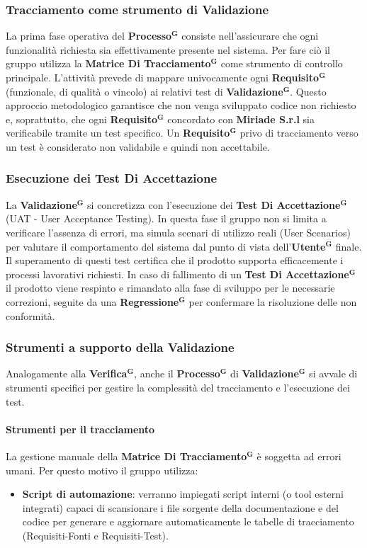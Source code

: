 \documentclass[a4paper,12pt]{article}
\newcommand{\term}[1]{\textbf{#1}$^\mathbf{G}$}
\begin{document}
\subsubsection{Tracciamento come strumento di Validazione}
La prima fase operativa del \term{Processo} consiste nell'assicurare che ogni funzionalità richiesta sia effettivamente presente nel sistema. Per fare ciò il gruppo utilizza la \textbf{\term{Matrice Di Tracciamento}} come strumento di controllo principale.
L'attività prevede di mappare univocamente ogni \term{Requisito} (funzionale, di qualità o vincolo) ai relativi test di \term{Validazione}.
Questo approccio metodologico garantisce che non venga sviluppato codice non richiesto e, soprattutto, che ogni \term{Requisito} concordato con \textbf{Miriade S.r.l} sia verificabile tramite un test specifico. Un \term{Requisito} privo di tracciamento verso un test è considerato non validabile e quindi non accettabile.

\subsubsection{Esecuzione dei Test Di Accettazione}
La \term{Validazione} si concretizza con l'esecuzione dei \textbf{\term{Test Di Accettazione}} (UAT - User Acceptance Testing).
In questa fase il gruppo non si limita a verificare l'assenza di errori, ma simula scenari di utilizzo reali (User Scenarios) per valutare il comportamento del sistema dal punto di vista dell'\term{Utente} finale.
Il superamento di questi test certifica che il prodotto supporta efficacemente i processi lavorativi richiesti. In caso di fallimento di un \term{Test Di Accettazione} il prodotto viene respinto e rimandato alla fase di sviluppo per le necessarie correzioni, seguite da una \term{Regressione} per confermare la risoluzione delle non conformità.

\subsubsection{Strumenti a supporto della Validazione}
Analogamente alla \term{Verifica}, anche il \term{Processo} di \term{Validazione} si avvale di strumenti specifici per gestire la complessità del tracciamento e l'esecuzione dei test.

\paragraph{Strumenti per il tracciamento}
La gestione manuale della \term{Matrice Di Tracciamento} è soggetta ad errori umani. Per questo motivo il gruppo utilizza:
\begin{itemize}
    \item \textbf{Script di automazione}: verranno impiegati script interni (o tool esterni integrati) capaci di scansionare i file sorgente della documentazione e del codice per generare e aggiornare automaticamente le tabelle di tracciamento (Requisiti-Fonti e Requisiti-Test).
\end{itemize}
\end{document}

